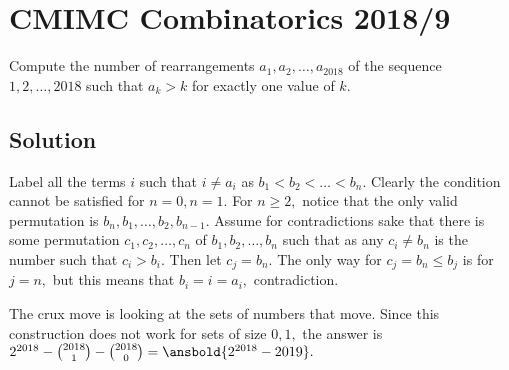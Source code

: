 \documentclass{article}
\begin{document}
\pagebreak\section{CMIMC Combinatorics 2018/9}
Compute the number of rearrangements $a_1,a_2,\ldots,a_{2018}$ of the sequence $1,2,\ldots,2018$ such that $a_k>k$ for exactly one value of $k.$

\subsection{Solution}
Label all the terms $i$ such that $i\neq a_i$ as $b_1<b_2<\ldots<b_n.$ Clearly the condition cannot be satisfied for $n=0,n=1.$ For $n\geq 2,$ notice that the only valid permutation is $b_n,b_1,\ldots,b_2,b_{n-1}.$ Assume for contradictions sake that there is some permutation $c_1,c_2,\ldots, c_n$ of $b_1,b_2,\ldots,b_n$ such that as any $c_i\neq b_n$ is the number such that $c_i>b_i.$ Then let $c_j=b_n.$ The only way for $c_j=b_n\leq b_j$ is for $j=n,$ but this means that $b_i=i=a_i,$ contradiction.
    
The crux move is looking at the sets of numbers that move. Since this construction does not work for sets of size $0,1,$ the answer is $2^{2018}-\binom{2018}{1}-\binom{2018}{0}=\ansbold{2^{2018}-2019}.$
\end{document}
